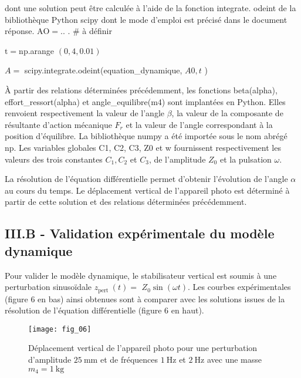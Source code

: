 dont une solution peut être calculée à l'aide de la fonction integrate. odeint de la bibliothèque Python scipy dont le mode d'emploi est précisé dans le document réponse. $\mathrm{AO}=.$. . \# à définir

$\mathrm{t}=\mathrm{np}$.arange $(0,4,0.01)$

$A=$ scipy.integrate.odeint(equation\_dynamique, $A 0, t$ )

À partir des relations déterminées précédemment, les fonctions beta(alpha), effort\_ressort(alpha) et angle\_equilibre(m4) sont implantées en Python. Elles renvoient respectivement la valeur de l'angle $\beta$, la valeur de la composante de résultante d'action mécanique $F_{r}$ et la valeur de l'angle correspondant à la position d'équilibre. La bibliothèque numpy a été importée sous le nom abrégé np. Les variables globales C1, C2, C3, Z0 et w fournissent respectivement les valeurs des trois constantes $C_{1}, C_{2}$ et $C_{3}$, de l'amplitude $Z_{0}$ et la pulsation $\omega$.

\ifprof
\begin{corrige}
\end{corrige}
\else
\fi

\ifprof
\begin{corrige}
\end{corrige}
\else
\fi

La résolution de l'équation différentielle permet d'obtenir l'évolution de l'angle $\alpha$ au cours du temps. Le déplacement vertical de l'appareil photo est déterminé à partir de cette solution et des relations déterminées précédemment.

\subsection{III.B - Validation expérimentale du modèle dynamique}
Pour valider le modèle dynamique, le stabilisateur vertical est soumis à une perturbation sinusoïdale $z_{\text {pert }}(t)=$ $Z_{0} \sin (\omega t)$. Les courbes expérimentales (figure 6 en bas) ainsi obtenues sont à comparer avec les solutions issues de la résolution de l'équation différentielle (figure 6 en haut).

\begin{figure}[H]
\centering
\texttt{[image: fig\_06]}
\caption{\label{fig:06} Déplacement vertical de l'appareil photo pour une perturbation d'amplitude $25 \mathrm{~mm}$ et de fréquences $1 \mathrm{~Hz}$ et $2 \mathrm{~Hz}$ avec une masse $m_{4}=1 \mathrm{~kg}$}
\end{figure}



